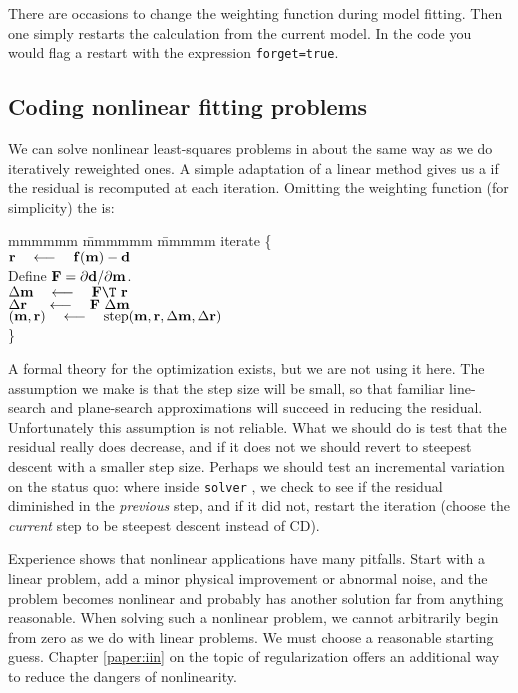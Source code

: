 \par
There are occasions to change the weighting function during model fitting.
Then one simply restarts the calculation from the current model.
In the code you would flag a restart with the expression \texttt{forget=true}.

\subsection{Coding nonlinear fitting problems}
We can solve nonlinear least-squares problems
in about the same way as we do iteratively reweighted ones.
A simple adaptation of a linear method gives us a  if
the residual is recomputed at each iteration.
Omitting the weighting function (for simplicity) the  is:
\begin{tabbing}
mmmmmm \= mmmmmm \= mmmmm \kill
\> {\rm iterate \{ }                                                    \\
\>      \> $\bold r \quad\longleftarrow\quad \bold f( \bold m) - \bold d$       \\
\>      \> Define $\bold F=\partial \bold d/\partial \bold m$.       \\
\>      \>  $\Delta\bold m  \padarrow \bold F\T\         \bold r$ \\
\>      \>  $\Delta\bold r\ \quad\longleftarrow\quad \bold F \ \Delta \bold m$  \\
\>      \>  $(\bold m,\bold r) \quad\longleftarrow\quad {\rm step}
             (\bold m,\bold r, \Delta\bold m,\Delta\bold r )$ \\
\>      \> \}
\end{tabbing}

\par
A formal theory for the optimization exists,
but we are not using it here.
The assumption we make is that the step size will be small,
so that familiar line-search and plane-search approximations
will succeed in reducing the residual.
Unfortunately this assumption is not reliable.
What we should do is test that the residual really does decrease,
and if it does not we should revert
to steepest descent with a smaller step size.
Perhaps we should test an incremental variation on the status quo:
where inside \texttt{solver} ,
we check to see if the residual
diminished in the {\it previous} step, and if it did not,
restart the iteration (choose the {\it current} step to be steepest descent instead of CD).
\par
Experience shows that nonlinear applications have many pitfalls.
Start with a linear problem,
add a minor physical improvement or abnormal noise,
and the problem becomes nonlinear and probably has another solution
far from anything reasonable.
When solving such a nonlinear problem,
we cannot arbitrarily begin from zero as we do with linear problems.
We must choose a reasonable starting guess.
Chapter \ref{paper:iin} on the topic of regularization
offers an additional way to reduce the dangers of nonlinearity.

